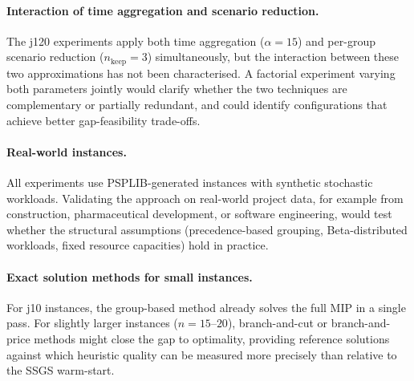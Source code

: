 \paragraph{Interaction of time aggregation and scenario
reduction.}
The j120 experiments apply both time aggregation ($\alpha=15$)
and per-group scenario reduction ($n_{\mathrm{keep}}=3$)
simultaneously, but the interaction between these two
approximations has not been characterised. A factorial
experiment varying both parameters jointly would clarify
whether the two techniques are complementary or partially
redundant, and could identify configurations that achieve
better gap-feasibility trade-offs.

\paragraph{Real-world instances.}
All experiments use PSPLIB-generated instances with synthetic
stochastic workloads. Validating the approach on real-world
project data, for example from construction, pharmaceutical
development, or software engineering, would test whether the
structural assumptions (precedence-based grouping, Beta-distributed
workloads, fixed resource capacities) hold in practice.

\paragraph{Exact solution methods for small instances.}
For j10 instances, the group-based method already solves the
full MIP in a single pass. For slightly larger instances
($n = 15$--$20$), branch-and-cut or branch-and-price methods
might close the gap to optimality, providing reference solutions
against which heuristic quality can be measured more precisely
than relative to the SSGS warm-start.
